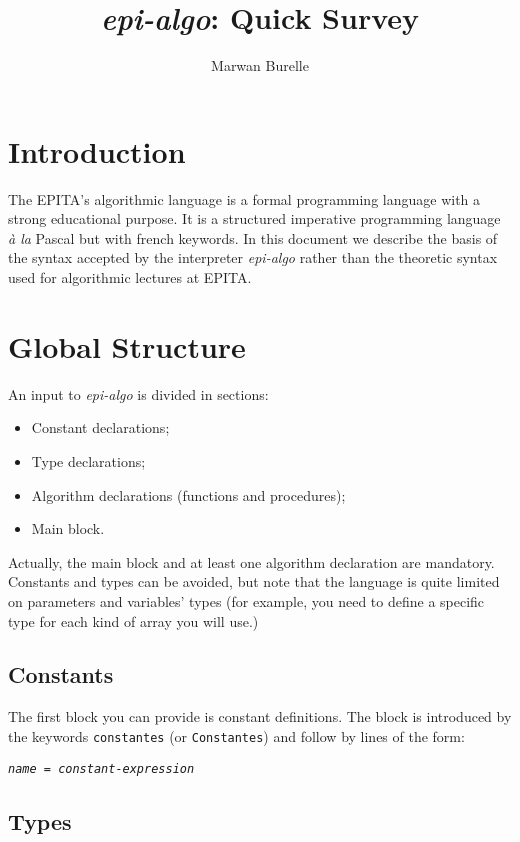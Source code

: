\documentclass[a4paper, pdftex, 12pt]{article}
\title{\emph{epi-algo}: Quick Survey}
\author{Marwan Burelle}
\begin{document}
\maketitle

\section{Introduction}
\label{sec:intro}

The EPITA's algorithmic language is a formal programming language with
a strong educational purpose. It is a structured imperative
programming language \emph{à la} Pascal but with french keywords. In
this document we describe the basis of the syntax accepted by the
interpreter \emph{epi-algo} rather than the theoretic syntax used for
algorithmic lectures at EPITA.

\section{Global Structure}
\label{sec:orga}

An input to \emph{epi-algo} is divided in sections:
\begin{itemize}
\item Constant declarations;
\item Type declarations;
\item Algorithm declarations (functions and procedures);
\item Main block.
\end{itemize}

Actually, the main block and at least one algorithm declaration are
mandatory. Constants and types can be avoided, but note that the
language is quite limited on parameters and variables' types (for
example, you need to define a specific type for each kind of array you
will use.)

\subsection{Constants}
\label{sec:const}

The first block you can provide is constant definitions. The block is
introduced by the keywords \texttt{constantes} (or
\texttt{Constantes}) and follow by lines of the form:
\begin{center}
  \texttt{\textit{name} = \textit{constant-expression}}
\end{center}

\subsection{Types}
\label{sec:types}
\end{document}
